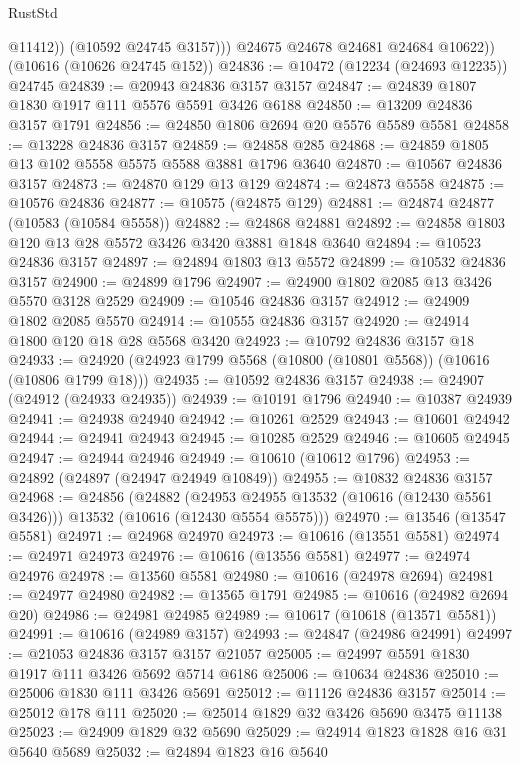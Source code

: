 \begin{lexlean}{RustStd}
\begin{coremodule}
                @11412))
            (@10592 @24745 @3157)))
        @24675
        @24678
        @24681
        @24684
        @10622))
    (@10616 (@10626 @24745 @152))
@24836 := @10472 (@12234 (@24693 @12235)) @24745
@24839 := @20943 @24836 @3157 @3157
@24847 := @24839 @1807 @1830 @1917 @111 @5576 @5591 @3426 @6188
@24850 := @13209 @24836 @3157 @1791
@24856 := @24850 @1806 @2694 @20 @5576 @5589 @5581
@24858 := @13228 @24836 @3157
@24859 := @24858 @285
@24868 := @24859 @1805 @13 @102 @5558 @5575 @5588 @3881 @1796 @3640
@24870 := @10567 @24836 @3157
@24873 := @24870 @129 @13 @129
@24874 := @24873 @5558
@24875 := @10576 @24836
@24877 := @10575 (@24875 @129)
@24881 := @24874 @24877 (@10583 (@10584 @5558))
@24882 := @24868 @24881
@24892 := @24858 @1803 @120 @13 @28 @5572 @3426 @3420 @3881 @1848 @3640
@24894 := @10523 @24836 @3157
@24897 := @24894 @1803 @13 @5572
@24899 := @10532 @24836 @3157
@24900 := @24899 @1796
@24907 := @24900 @1802 @2085 @13 @3426 @5570 @3128 @2529
@24909 := @10546 @24836 @3157
@24912 := @24909 @1802 @2085 @5570
@24914 := @10555 @24836 @3157
@24920 := @24914 @1800 @120 @18 @28 @5568 @3420
@24923 := @10792 @24836 @3157 @18
@24933 := @24920 (@24923 @1799 @5568 (@10800 (@10801 @5568)) (@10616 (@10806 @1799 @18)))
@24935 := @10592 @24836 @3157
@24938 := @24907 (@24912 (@24933 @24935))
@24939 := @10191 @1796
@24940 := @10387 @24939
@24941 := @24938 @24940
@24942 := @10261 @2529
@24943 := @10601 @24942
@24944 := @24941 @24943
@24945 := @10285 @2529
@24946 := @10605 @24945
@24947 := @24944 @24946
@24949 := @10610 (@10612 @1796)
@24953 := @24892 (@24897 (@24947 @24949 @10849))
@24955 := @10832 @24836 @3157
@24968 := @24856
    (@24882
      (@24953 @24955 @13532 (@10616 (@12430 @5561 @3426)))
      @13532
      (@10616 (@12430 @5554 @5575)))
@24970 := @13546 (@13547 @5581)
@24971 := @24968 @24970
@24973 := @10616 (@13551 @5581)
@24974 := @24971 @24973
@24976 := @10616 (@13556 @5581)
@24977 := @24974 @24976
@24978 := @13560 @5581
@24980 := @10616 (@24978 @2694)
@24981 := @24977 @24980
@24982 := @13565 @1791
@24985 := @10616 (@24982 @2694 @20)
@24986 := @24981 @24985
@24989 := @10617 (@10618 (@13571 @5581))
@24991 := @10616 (@24989 @3157)
@24993 := @24847 (@24986 @24991)
@24997 := @21053 @24836 @3157 @3157 @21057
@25005 := @24997 @5591 @1830 @1917 @111 @3426 @5692 @5714 @6186
@25006 := @10634 @24836
@25010 := @25006 @1830 @111 @3426 @5691
@25012 := @11126 @24836 @3157
@25014 := @25012 @178 @111
@25020 := @25014 @1829 @32 @3426 @5690 @3475 @11138
@25023 := @24909 @1829 @32 @5690
@25029 := @24914 @1823 @1828 @16 @31 @5640 @5689
@25032 := @24894 @1823 @16 @5640

\end{coremodule}
\end{lexlean}
